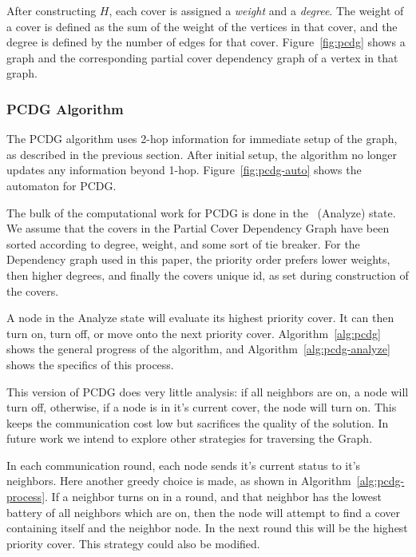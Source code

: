 \documentclass[technote, 10pt, letter]{IEEEtran}
\begin{document}
After constructing $H$, each cover is assigned a {\em weight} and a {\em degree}. The weight of a cover is defined as the sum of the weight of the vertices in that cover, and the degree is defined by the number of edges for that cover. Figure~\ref{fig:pcdg} shows a graph and the corresponding partial cover dependency graph of a vertex in that graph.



\subsubsection{PCDG Algorithm}
\label{sec:pcdg-alg}

The PCDG algorithm uses 2-hop information for immediate setup of the graph, as described in the previous section. After initial setup, the algorithm no longer updates any information beyond 1-hop. Figure~\ref{fig:pcdg-auto} shows the automaton for PCDG.



The bulk of the computational work for PCDG is done in the \cAd\ (Analyze) state. We assume that the covers in the Partial Cover Dependency Graph have been sorted according to degree, weight, and some sort of tie breaker. For the Dependency graph used in this paper, the priority order prefers lower weights, then higher degrees, and finally the covers unique id, as set during construction of the covers.

A node in the Analyze state will evaluate its highest priority cover. It can then turn on, turn off, or move onto the next priority cover. Algorithm~\ref{alg:pcdg} shows the general progress of the algorithm, and Algorithm~\ref{alg:pcdg-analyze} shows the specifics of this process.

This version of PCDG does very little analysis: if all neighbors are on, a node will turn off, otherwise, if a node is in it's current cover, the node will turn on. This keeps the communication cost low but sacrifices the quality of the solution. In future work we intend to explore other strategies for traversing the Graph.

In each communication round, each node sends it's current status to it's neighbors. Here another greedy choice is made, as shown in Algorithm~\ref{alg:pcdg-process}. If a neighbor turns on in a round, and that neighbor has the lowest battery of all neighbors which are on, then the node will attempt to find a cover containing itself and the neighbor node. In the next round this will be the highest priority cover. This strategy could also be modified. 
\end{document}
